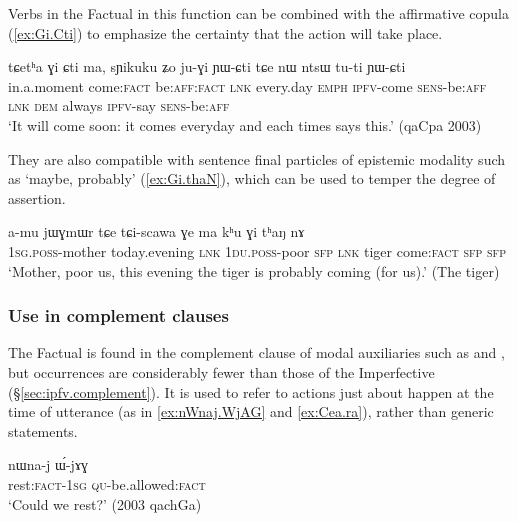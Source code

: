 Verbs in the Factual in this function can be combined with the affirmative copula  (\ref{ex:Gi.Cti}) to emphasize the certainty that the action will take place. 

\begin{exe}
\ex \label{ex:Gi.Cti}
\gll tɕetʰa ɣi ɕti ma, sɲikuku ʑo ju-ɣi ɲɯ-ɕti tɕe nɯ ntsɯ tu-ti ɲɯ-ɕti \\
 in.a.moment come:\textsc{fact} be:\textsc{aff}:\textsc{fact} \textsc{lnk} every.day \textsc{emph} \textsc{ipfv}-come \textsc{sens}-be:\textsc{aff} \textsc{lnk} \textsc{dem} always \textsc{ipfv}-say \textsc{sens}-be:\textsc{aff} \\
\glt `It will come  soon: it comes everyday and each times says this.' (qaCpa 2003)
\end{exe}

They are also compatible with sentence final particles of epistemic modality such as  `maybe, probably' (\ref{ex:Gi.thaN}), which can be used to temper the degree of assertion.

\begin{exe}
\ex \label{ex:Gi.thaN}
\gll a-mu jɯɣmɯr tɕe tɕi-scawa ɣe ma kʰu ɣi tʰaŋ nɤ \\
 \textsc{1sg}.\textsc{poss}-mother today.evening \textsc{lnk}  \textsc{1du}.\textsc{poss}-poor \textsc{sfp} \textsc{lnk} tiger  come:\textsc{fact} \textsc{sfp} \textsc{sfp} \\
\glt `Mother, poor us, this evening the tiger is probably coming (for us).' (The tiger)
\end{exe}

\subsubsection{Use in complement clauses} \label{sec:fact.complement}
The Factual is found in the complement clause of modal auxiliaries such as  and , but occurrences are considerably fewer than those of the Imperfective (§\ref{sec:ipfv.complement}). It is used to refer to actions just about happen at the time of utterance (as in \ref{ex:nWnaj.WjAG} and \ref{ex:Cea.ra}), rather than generic statements.


\begin{exe}
\ex \label{ex:nWnaj.WjAG}
\gll nɯna-j ɯ́-jɤɣ \\
rest:\textsc{fact}-\textsc{1sg} \textsc{qu}-be.allowed:\textsc{fact} \\
\glt `Could we rest?' (2003 qachGa) 
\end{exe}

